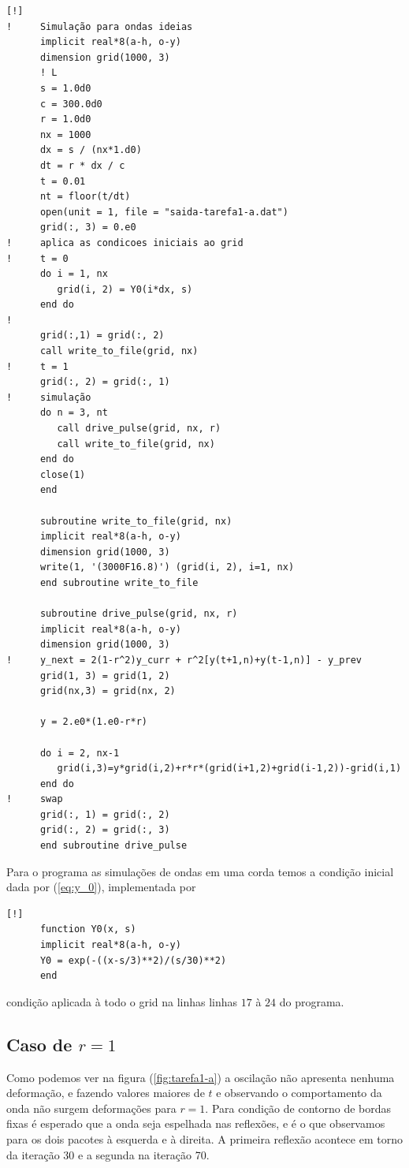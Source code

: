 \documentclass[a4paper, 11pt]{article}
\begin{document}
\begin{verbatim}[!]
!     Simulação para ondas ideias
      implicit real*8(a-h, o-y)
      dimension grid(1000, 3)
      ! L 
      s = 1.0d0
      c = 300.0d0
      r = 1.0d0
      nx = 1000
      dx = s / (nx*1.d0)
      dt = r * dx / c
      t = 0.01
      nt = floor(t/dt)
      open(unit = 1, file = "saida-tarefa1-a.dat")
      grid(:, 3) = 0.e0
!     aplica as condicoes iniciais ao grid
!     t = 0
      do i = 1, nx
         grid(i, 2) = Y0(i*dx, s)
      end do
!     
      grid(:,1) = grid(:, 2)
      call write_to_file(grid, nx)
!     t = 1
      grid(:, 2) = grid(:, 1)
!     simulação
      do n = 3, nt
         call drive_pulse(grid, nx, r)
         call write_to_file(grid, nx)
      end do
      close(1)
      end

      subroutine write_to_file(grid, nx)
      implicit real*8(a-h, o-y)
      dimension grid(1000, 3)
      write(1, '(3000F16.8)') (grid(i, 2), i=1, nx)
      end subroutine write_to_file

      subroutine drive_pulse(grid, nx, r)
      implicit real*8(a-h, o-y)
      dimension grid(1000, 3)
!     y_next = 2(1-r^2)y_curr + r^2[y(t+1,n)+y(t-1,n)] - y_prev
      grid(1, 3) = grid(1, 2)
      grid(nx,3) = grid(nx, 2)

      y = 2.e0*(1.e0-r*r)

      do i = 2, nx-1
         grid(i,3)=y*grid(i,2)+r*r*(grid(i+1,2)+grid(i-1,2))-grid(i,1)
      end do
!     swap
      grid(:, 1) = grid(:, 2)
      grid(:, 2) = grid(:, 3)
      end subroutine drive_pulse
\end{verbatim}

Para o programa as simulações de ondas em uma corda temos a condição inicial dada por
(\ref{eq:y_0}), implementada por
\begin{verbatim}[!]
      function Y0(x, s)
      implicit real*8(a-h, o-y)
      Y0 = exp(-((x-s/3)**2)/(s/30)**2)
      end
\end{verbatim}

condição aplicada à todo o grid na linhas linhas $17$ à $24$ do programa.

\clearpage
\subsection{Caso de \( r = 1 \) }

Como podemos ver na figura (\ref{fig:tarefa1-a}) a oscilação não apresenta nenhuma deformação, e
fazendo valores maiores de \( t \) e observando o comportamento da onda não surgem deformações para
\( r = 1 \). Para condição de contorno de bordas fixas é esperado que a onda seja espelhada nas
reflexões, e é o que observamos para os dois pacotes à esquerda e à direita. A primeira reflexão
acontece em torno da iteração 30  e a segunda na iteração 70.
\end{document}
